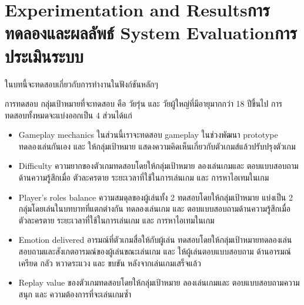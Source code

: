 \chapter{\ifproject%
\ifenglish Experimentation and Results\else การทดลองและผลลัพธ์\fi
\else%
\ifenglish System Evaluation\else การประเมินระบบ\fi
\fi}

ในบทนี้จะทดสอบเกี่ยวกับการทำงานในฟังก์ชันหลักๆ

การทดสอบ
กลุ่มเป้าหมายที่จะทดสอบ คือ วัยรุ่น และ วัยผู้ใหญ่ที่มีอายุมากกว่า 18 ปีขึ้นไป การทดสอบทั้งหมดจะแบ่งออกเป็น 4 ส่วนได้แก่
\begin{itemize}
    \item Gameplay mechanics ในส่วนนี้เราจะทดสอบ gameplay ในช่วงพัฒนา prototype ทดลองเล่นกันเอง และ ให้กลุ่มเป้าหมาย แสดงความคิดเห็นเกี่ยวกับตัวเกมส์แล้วปรับปรุงตัวเกม
    \item Difficulty ความยากของตัวเกมทดสอบโดยให้กลุ่มเป้าหมาย ลองเล่นเกมและ ตอบแบบสอบถามด้านความรู้สึกเมื่อ ตัวละครตาย ระยะเวลาที่ใช้ในการเล่นเกม และ การหาไอเทมในเกม
    \item Player's roles balance ความสมดุลของผู้เล่นทั้ง 2 ทดสอบโดยให้กลุ่มเป้าหมาย แบ่งเป็น 2 กลุ่มโดยเล่นในบทบาทที่แตกต่างกัน  ทดลองเล่นเกม และ ตอบแบบสอบถามด้านความรู้สึกเมื่อ ตัวละครตาย ระยะเวลาที่ใช้ในการเล่นเกม และ การหาไอเทมในเกม
    \item Emotion delivered อารมณ์ที่ตัวเกมสื่อให้กับผู้เล่น ทดสอบโดยให้กลุ่มเป้าหมายทดลองเล่น สอบถามและสังเกตอารมณ์ของผู้เล่นขณะเล่นเกม และ ให้ผู้เล่นตอบแบบสอบถาม ด้านอารมณ์ เครียด กลัว หวาดระแวง และ ขบขัน หลังจากเล่นเกมเสร็จแล้ว
    \item Replay value ของตัวเกมทดสอบโดยให้กลุ่มเป้าหมาย ลองเล่นเกมและ ตอบแบบสอบถามความสนุก และ ความต้องการที่จะเล่นเกมซ้ำ
\end{itemize}